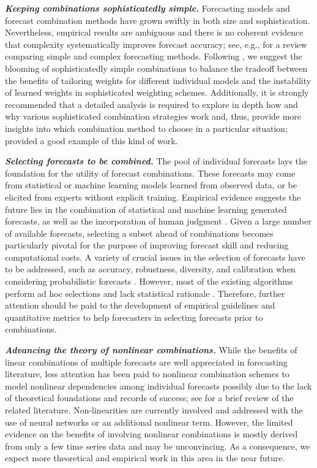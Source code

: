 \documentclass[11pt]{article}
\begin{document}
\textbf{\textit{Keeping combinations sophisticatedly simple.}} Forecasting models and forecast combination methods have grown swiftly in both size and sophistication. Nevertheless, empirical results are ambiguous and there is no coherent evidence that complexity systematically improves forecast accuracy; see, e.g., \cite{Green2015-mi} for a review comparing simple and complex forecasting methods. Following \cite{Zellner2001-si}, we suggest the blooming of sophisticatedly simple combinations to balance the tradeoff between the benefits of tailoring weights for different individual models and the instability of learned weights in sophisticated weighting schemes. Additionally, it is strongly recommended that a detailed analysis is required to explore in depth how and why various sophisticated combination strategies work and, thus, provide more insights into which combination method to choose in a particular situation; \cite{Petropoulos2018-fw} provided a good example of this kind of work.

\textbf{\textit{Selecting forecasts to be combined.}} The pool of individual forecasts lays the foundation for the utility of forecast combinations. These forecasts may come from statistical or machine learning models learned from observed data, or be elicited from experts without explicit training. Empirical evidence suggests the future lies in the combination of statistical and machine learning generated forecasts, as well as the incorporation of human judgment \citep{Petropoulos2018-ad,Makridakis2020-hu,Petropoulos2021-ft}. Given a large number of available forecasts, selecting a subset ahead of combinations becomes particularly pivotal for the purpose of improving forecast skill and reducing computational costs. A variety of crucial issues in the selection of forecasts have to be addressed, such as accuracy, robustness, diversity, and calibration when considering probabilistic forecasts \citep{Lichtendahl2020-ut}. However, most of the existing algorithms perform ad hoc selections and lack statistical rationale \citep{Kourentzes2019-na}. Therefore, further attention should be paid to the development of empirical guidelines and quantitative metrics to help forecasters in selecting forecasts prior to combinations.

\textbf{\textit{Advancing the theory of nonlinear combinations.}} While the benefits of linear combinations of multiple forecasts are well appreciated in forecasting literature, less attention has been paid to nonlinear combination schemes to model nonlinear dependencies among individual forecasts possibly due to the lack of theoretical foundations and records of success; see \cite{Timmermann2006-en} for a brief review of the related literature. Non-linearities are currently involved and addressed with the use of neural networks or an additional nonlinear term. However, the limited evidence on the benefits of involving nonlinear combinations is mostly derived from only a few time series data and may be unconvincing. As a consequence, we expect more theoretical and empirical work in this area in the near future.
\end{document}
